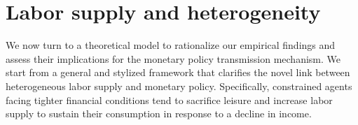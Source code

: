 \documentclass[a4paper,12pt]{article}%
\begin{document}







\section{Labor supply and heterogeneity}\label{T:Theory}

We now turn to a theoretical model to rationalize our empirical findings and assess their implications for the monetary policy transmission mechanism. We start from a general and stylized framework that clarifies the novel link between heterogeneous labor supply and monetary policy. Specifically, constrained agents facing tighter financial conditions tend to sacrifice leisure and increase labor supply to sustain their consumption in response to a decline in income.
\end{document}
